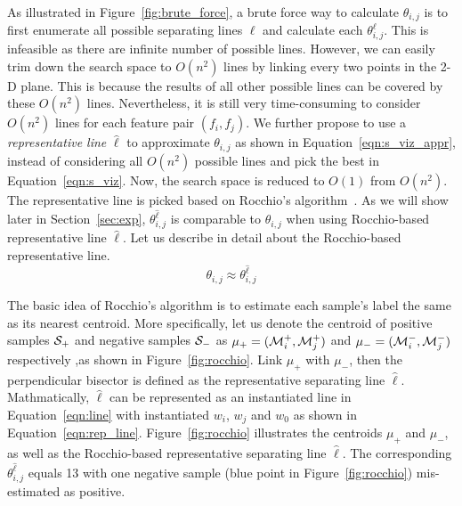  As illustrated in Figure~\ref{fig:brute_force}, a brute force way to calculate $\theta_{i,j}$ is to first enumerate all possible separating lines $\ell$ and calculate each $\theta_{i,j}^\ell$. This is infeasible as there are infinite number of possible lines. However, we can easily trim down the search space to $O(n^2)$ lines by linking every two points in the 2-D plane. This is because the results of all other possible lines can be covered by these $O(n^2)$ lines. Nevertheless, it is still very time-consuming to consider $O(n^2)$ lines for each feature pair $(f_i,f_j)$. We further propose to use a {\em representative line} $\hat{\ell}$ to approximate $\theta_{i, j}$ as shown in Equation~\ref{eqn:s_viz_appr}, instead of considering all $O(n^2)$ possible lines and pick the best in Equation~\ref{eqn:s_viz}. Now, the search space is reduced to $O(1)$ from $O(n^2)$. The representative line is picked based on Rocchio's algorithm~\cite{rocchio1971relevance}. As we will show later in Section~\ref{sec:exp}, $\theta_{i,j}^{\hat{\ell}}$ is comparable to $\theta_{i,j}$ when using Rocchio-based representative line $\hat{\ell}$. Let us describe in detail about the Rocchio-based representative line.
\begin{equation}\label{eqn:s_viz_appr}
\theta_{i,j}  \approx \theta_{i,j}^{\hat{\ell}}
\end{equation}

 The basic idea of Rocchio's algorithm is to estimate each sample's label the same as its nearest centroid. More specifically, let us denote the centroid of positive samples $\sss_+$ and negative samples $\sss_-$ as $\mu_+=(\mm_i^+,\mm_j^+)$ and $\mu_-=(\mm_i^-,\mm_j^-)$ respectively ,as shown in Figure~\ref{fig:rocchio}. Link $\mu_+$ with $\mu_-$, then the perpendicular bisector is defined as the representative separating line $\hat{\ell}$. Mathmatically, $\hat{\ell}$ can be represented as an instantiated line in Equation~\ref{eqn:line} with instantiated $w_i$, $w_j$ and $w_0$ as shown in Equation~\ref{eqn:rep_line}. Figure~\ref{fig:rocchio} illustrates the centroids $\mu_+$ and $\mu_-$, as well as the Rocchio-based representative separating line $\hat{\ell}$. The corresponding $\theta_{i,j}^{\hat{\ell}}$ equals 13 with one negative sample (blue point in Figure~\ref{fig:rocchio}) mis-estimated as positive.



